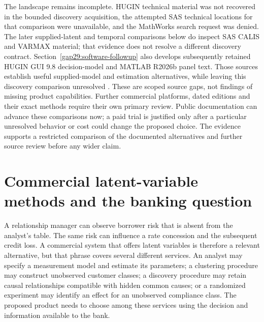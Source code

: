 The landscape remains incomplete. HUGIN technical material was not recovered
in the bounded discovery acquisition, the attempted SAS technical locations
for that comparison were unavailable, and the MathWorks search request was
denied. The later supplied-latent and temporal comparisons below do inspect
SAS CALIS and VARMAX material; that evidence does not resolve a different
discovery contract. Section~\ref{gap29:software-followup} also develops
subsequently retained HUGIN GUI 9.8 decision-model and MATLAB R2026b panel
text. Those sources establish useful supplied-model and estimation
alternatives, while leaving this discovery comparison unresolved
\citep{gap29hugin,gap29matlab}. These are scoped source gaps, not findings of
missing product capabilities. Further commercial
platforms, dated editions and their exact methods require their own primary
review. Public documentation can advance these comparisons now; a paid
trial is justified only after a particular unresolved behavior or cost could
change the proposed choice. The evidence supports a restricted comparison
of the documented alternatives and further source review before any wider claim.
\label{exec13:commercial-end}


\hypertarget{commercial-latent-variable-methods-and-the-banking-question}{%
\section{Commercial latent-variable methods and the banking
question}\label{commercial-latent-variable-methods-and-the-banking-question}}

\label{exec13:latent-commercial}

A relationship manager can observe borrower risk that is absent from the
analyst's table. The same risk can influence a rate concession and the
subsequent credit loss. A commercial system that offers latent variables
is therefore a relevant alternative, but that phrase covers several
different services. An analyst may specify a measurement model and
estimate its parameters; a clustering procedure may construct unobserved
customer classes; a discovery procedure may retain causal relationships
compatible with hidden common causes; or a randomized experiment may
identify an effect for an unobserved compliance class. The proposed
product needs to choose among these services using the decision and
information available to the bank.

